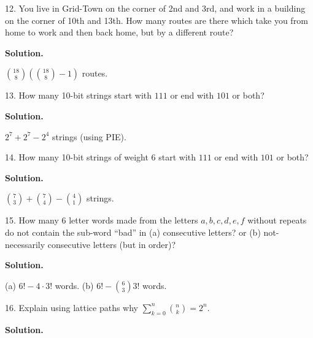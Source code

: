 \documentclass[10pt,]{book}
\theoremstyle{plain}
\theoremstyle{definition}
\theoremstyle{definition}
\theoremstyle{definition}
\numberwithin{equation}{section}
\begin{document}
\begin{exerciselist}
\item[12.]\hypertarget{exercise-113}{}
            You live in Grid-Town on the corner of 2nd and 3rd, and work in a building on the corner of 10th and 13th. How many routes are there which take you from home to work and then back home, but by a different route?
\par\smallskip
\par\smallskip
\noindent\textbf{Solution.}\hypertarget{solution-164}{}\quad

            \({18 \choose 8}\left({18 \choose 8} - 1\right)\) routes.
\item[13.]\hypertarget{exercise-114}{}
            How many 10-bit strings start with \(111\) or end with \(101\) or both?
\par\smallskip
\par\smallskip
\noindent\textbf{Solution.}\hypertarget{solution-165}{}\quad

            \(2^7 + 2^7 - 2^4\) strings (using PIE).
\item[14.]\hypertarget{exercise-115}{}
            How many 10-bit strings of weight 6 start with \(111\) or end with \(101\) or both?
\par\smallskip
\par\smallskip
\noindent\textbf{Solution.}\hypertarget{solution-166}{}\quad

            \({7 \choose 3} + {7 \choose 4} - {4 \choose 1}\) strings.
\item[15.]\hypertarget{exercise-116}{}
            How many 6 letter words made from the letters \(a,b,c,d,e,f\) without repeats do not contain the sub-word ``bad'' in (a) consecutive letters? or (b) not-necessarily consecutive letters (but in order)?
\par\smallskip
\par\smallskip
\noindent\textbf{Solution.}\hypertarget{solution-167}{}\quad

            (a) \(6! - 4\cdot 3!\) words. (b) \(6! - {6 \choose 3}3!\) words.
\item[16.]\hypertarget{exercise-117}{}
            Explain using lattice paths why \(\sum_{k=0}^n {n \choose k} = 2^n\).
\par\smallskip
\par\smallskip
\noindent\textbf{Solution.}\hypertarget{solution-168}{}\quad


\end{exerciselist}
\end{document}

